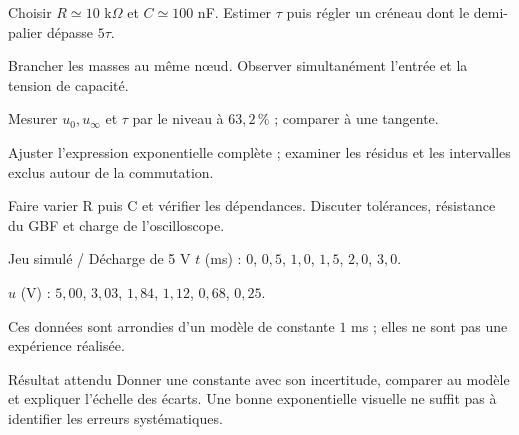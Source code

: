 \begin{questions}
\item Choisir $R\simeq10$ k$\Omega$ et $C\simeq100$ nF. Estimer $\tau$ puis régler un créneau dont le demi-palier dépasse $5\tau$.
\item Brancher les masses au même nœud. Observer simultanément l’entrée et la tension de capacité.
\item Mesurer $u_0,u_\infty$ et $\tau$ par le niveau à $63{,}2\,\%$ ; comparer à une tangente.
\item Ajuster l’expression exponentielle complète ; examiner les résidus et les intervalles exclus autour de la commutation.
\item Faire varier R puis C et vérifier les dépendances. Discuter tolérances, résistance du GBF et charge de l’oscilloscope.
\end{questions}
\begin{docu}{Jeu simulé / Décharge de 5 V}
$t$ (ms) : $0$, $0{,}5$, $1{,}0$, $1{,}5$, $2{,}0$, $3{,}0$.\par $u$ (V) : $5{,}00$, $3{,}03$, $1{,}84$, $1{,}12$, $0{,}68$, $0{,}25$.\par Ces données sont arrondies d’un modèle de constante $1$ ms ; elles ne sont pas une expérience réalisée.
\end{docu}
\begin{methode}{Résultat attendu}
Donner une constante avec son incertitude, comparer au modèle et expliquer l’échelle des écarts. Une bonne exponentielle visuelle ne suffit pas à identifier les erreurs systématiques.
\end{methode}


